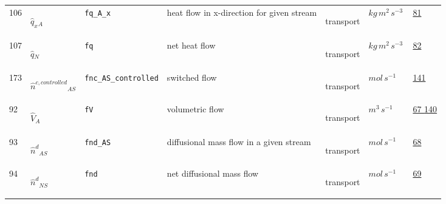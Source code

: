 \begin{longtable}{|p{1cm}|p{2.5cm}|p{4.5cm}|p{8cm}|p{3.0cm}|p{3cm}|p{1cm}|}
                 \\
            106
             & \hypertarget{"v:106"}{ $ {{\hat{q}_{x}}}{_{A}} $}
             & \verb|fq_A_x|
             & heat flow in x-direction for given stream
             & \begin{lay}transport \end{lay}
             & $ kg \,m^{2} \,s^{-3} \, $
             &                 \hyperlink{"e:81"}{ 81 }
                 \\
            107
             & \hypertarget{"v:107"}{ $ {{\hat{q}}}{_{N}} $}
             & \verb|fq|
             & net heat flow
             & \begin{lay}transport \end{lay}
             & $ kg \,m^{2} \,s^{-3} \, $
             &                 \hyperlink{"e:82"}{ 82 }
                 \\
            173
             & \hypertarget{"v:173"}{ $ {\hat{n}^{c,controlled}}{_{{A S}}} $}
             & \verb|fnc_AS_controlled|
             & switched flow
             & \begin{lay}transport \end{lay}
             & $ mol \,s^{-1} \, $
             &                 \hyperlink{"e:141"}{ 141 }
                 \\
            92
             & \hypertarget{"v:92"}{ $ {\hat{V}}{_{A}} $}
             & \verb|fV|
             & volumetric flow
             & \begin{lay}transport \end{lay}
             & $ m^{3} \,s^{-1} \, $
             &                 \hyperlink{"e:67"}{ 67 }
                                 \hyperlink{"e:140"}{ 140 }
                 \\
            93
             & \hypertarget{"v:93"}{ $ {{\hat{n}^{d}}}{_{{A S}}} $}
             & \verb|fnd_AS|
             & diffusional mass flow in a given stream
             & \begin{lay}transport \end{lay}
             & $ mol \,s^{-1} \, $
             &                 \hyperlink{"e:68"}{ 68 }
                 \\
            94
             & \hypertarget{"v:94"}{ $ {{\hat{n}^{d}}}{_{{N S}}} $}
             & \verb|fnd|
             & net diffusional mass flow
             & \begin{lay}transport \end{lay}
             & $ mol \,s^{-1} \, $
             &                 \hyperlink{"e:69"}{ 69 }

\end{longtable}
